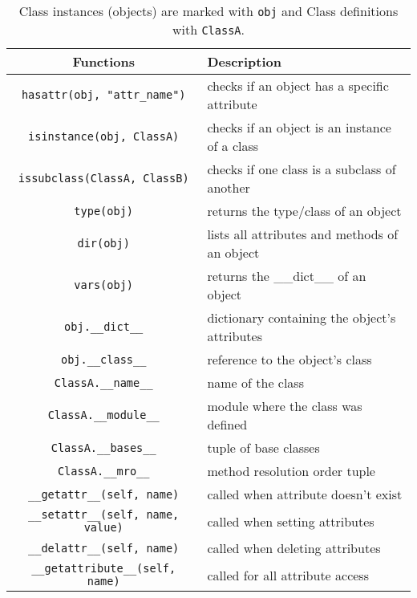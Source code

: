   \begin{definition}
    \begin{table}[H]
      \centering
      \begin{tabular}{|c|p{8cm}|}
        \hline
        \textbf{Functions} & \textbf{Description} \\
        \hline 
        \texttt{hasattr(obj, "attr\_name")} & checks if an object has a specific attribute \\
        \hline
        \texttt{isinstance(obj, ClassA)} & checks if an object is an instance of a class \\
        \hline
        \texttt{issubclass(ClassA, ClassB)} & checks if one class is a subclass of another \\
        \hline
        \texttt{type(obj)} & returns the type/class of an object \\
        \hline
        \texttt{dir(obj)} & lists all attributes and methods of an object \\
        \hline
        \texttt{vars(obj)} & returns the \_\_dict\_\_ of an object \\
        \hline
        \texttt{obj.\_\_dict\_\_} & dictionary containing the object's attributes \\
        \hline
        \texttt{obj.\_\_class\_\_} & reference to the object's class \\
        \hline
        \texttt{ClassA.\_\_name\_\_} & name of the class \\
        \hline
        \texttt{ClassA.\_\_module\_\_} & module where the class was defined \\
        \hline
        \texttt{ClassA.\_\_bases\_\_} & tuple of base classes \\
        \hline
        \texttt{ClassA.\_\_mro\_\_} & method resolution order tuple \\
        \hline
        \texttt{\_\_getattr\_\_(self, name)} & called when attribute doesn't exist \\
        \hline
        \texttt{\_\_setattr\_\_(self, name, value)} & called when setting attributes \\
        \hline
        \texttt{\_\_delattr\_\_(self, name)} & called when deleting attributes \\
        \hline
        \texttt{\_\_getattribute\_\_(self, name)} & called for all attribute access \\
        \hline
      \end{tabular}
      \caption{Class instances (objects) are marked with \texttt{obj} and Class definitions with \texttt{ClassA}.}
      \label{tab:functions_for_classes}
    \end{table}
  \end{definition}

